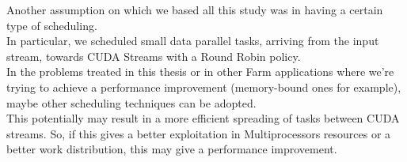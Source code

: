  Another assumption on which we based all this study was in having a certain type of scheduling.\\
 In particular, we scheduled small data parallel tasks, arriving from the input stream, towards CUDA Streams with a Round Robin policy.\\ In the problems treated in this thesis or in other Farm applications where we're trying to achieve a performance improvement (memory-bound ones for example), maybe other scheduling techniques can be adopted.\\
  This potentially may result in a more efficient spreading of tasks between CUDA streams. So, if this gives a better exploitation in Multiprocessors resources or a better work distribution, this may give a performance improvement.
 